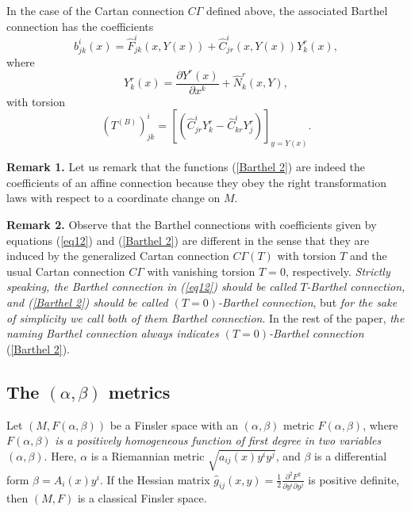 \documentclass[aps,superscriptaddress, showpacs,preprintnumbers, superscriptaddress, nofootinbibt,twocolumn]{revtex4-2}
\begin{document}
In the case of the Cartan connection $C\Gamma$ defined above, the associated Barthel connection has the coefficients
\begin{equation}\label{Barthel 2}
    b_{jk}^{i}(x)=\hat{F}_{jk}^{i}\left( x,Y(x)\right) +\hat{C}_{jr}^{i}\left( x,Y(x)\right)
Y_{k}^{r}(x),
\end{equation}
where
\begin{equation*}
Y_{k}^{r}(x)=\frac{\partial Y^{r}(x)}{\partial x^{k}}+\hat{N}_{k}^{r}(x,Y),
\end{equation*}
with torsion
\begin{equation*}
\left( T^{(B)}\right) _{jk}^{i}=\left[\left(
\hat{C}_{jr}^{i}Y_{k}^{r}-\hat{C}_{kr}^{i}Y_{j}^{r}\right) \right] _{y=Y(x)}.
\end{equation*}

{\bf Remark 1. }
Let us remark that the functions (\ref{Barthel 2}) are indeed the coefficients of an affine connection because they obey the right transformation laws with respect to a coordinate change on $M$.

{\bf Remark 2.} Observe that the Barthel connections with coefficients given by equations (\ref{eq12}) and (\ref{Barthel 2}) are different in the sense that they are induced by the generalized Cartan connection $C\Gamma(T)$ with torsion $T$  and the usual Cartan connection $C\Gamma$ with vanishing torsion $T=0$, respectively. {\it Strictly speaking, the Barthel connection in (\ref{eq12}) should be called $T$-Barthel connection, and (\ref{Barthel 2}) should be called $(T=0)$-Barthel
    connection}, but {\it for the sake of simplicity we call both of them Barthel connection}. In the rest of the paper, {\it the naming Barthel connection always {\it indicates  $(T=0)$-Barthel connection}} (\ref{Barthel 2}).


\subsection{The  $\left( \alpha ,\beta \right) $ metrics}

Let $\left( M,F\left( \alpha ,\beta \right) \right) $ be a Finsler space
with an $\left( \alpha ,\beta \right) $ metric $F\left( \alpha ,\beta
\right) $, where $F(\alpha ,\beta )$ {\it is a positively homogeneous function of
first degree in two variables} $(\alpha ,\beta )$.  Here, $\alpha $ is a
Riemannian metric $\sqrt{a_{ij}(x)y^{i}y^{j}}$, and $\beta $ is a
differential form $\beta =A_{i}(x)y^{i}$. If the Hessian matrix $\hat{g}_{ij}(x,y)=\frac{1}{2}\frac{\partial ^2 F^2}{\partial y^i\partial y^j}$ is positive definite, then $(M,F)$ is a classical Finsler space.
\end{document}
